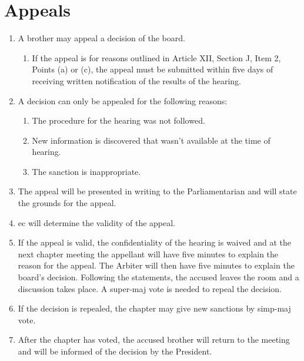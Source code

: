 \section{Appeals}
	\begin{enumerate}
		\item A brother may appeal a decision of the board.
        \begin{enumerate}
            \item If the appeal is for reasons outlined in Article XII, Section J, Item 2, Points (a) or (c), the appeal must be submitted within five days of receiving written notification of the results of the hearing.
        \end{enumerate}
		\item A decision can only be appealed for the following reasons:
			\begin{enumerate}
				\item The procedure for the hearing was not followed.
				\item New information is discovered that wasn't available at the time of hearing.
				\item The sanction is inappropriate.
			\end{enumerate}
		\item The appeal will be presented in writing to the Parliamentarian and will state the grounds for the appeal.
		\item \gls{ec} will determine the validity of the appeal.
		\item If the appeal is valid, the confidentiality of the hearing is waived and at the next chapter meeting the appellant will have five minutes to explain the reason for the appeal. The Arbiter will then have five minutes to explain the board's decision. Following the statements, the accused leaves the room and a discussion takes place. A \gls{super-maj} vote is needed to repeal the decision.
		\item If the decision is repealed, the chapter may give new sanctions by \gls{simp-maj} vote.
		\item After the chapter has voted, the accused brother will return to the meeting and will be informed of the decision by the President.
	\end{enumerate}

